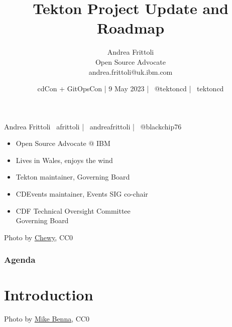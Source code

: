 \documentclass[aspectratio=169,11pt,hyperref={colorlinks=true}]{beamer}
\title{Tekton Project Update and Roadmap \faRobot\faCat}
\date[9 May 2023 ]{cdCon + GitOpsCon | 9 May 2023 | \faTwitter ~@tektoncd | \faGithub ~tektoncd}
\author[Andrea Frittoli]{%
  Andrea Frittoli \\
  Open Source Advocate \\
  andrea.frittoli@uk.ibm.com
}
\begin{document}
\begin{frame}
\titlepage{}
\end{frame}

\begin{speakerframe}{Andrea Frittoli}%
  {%
  \faGithub ~afrittoli | \faLinkedin ~andreafrittoli | \faTwitter ~@blackchip76
  }%
  {%
  \begin{itemize}
    \item{Open Source Advocate @ IBM}
    \item{Lives in Wales, enjoys the wind}
    \item{Tekton maintainer, Governing Board}
    \item{CDEvents maintainer, Events SIG co-chair}
    \item{CDF Technical Oversight Committee \\ Governing Board}
  \end{itemize}
  }%
\end{speakerframe}

\begin{lpicrblack}{%
  Photo by \href{https://unsplash.com/@chewy}{\underline{Chewy}}, CC0
  }%
  {%
  \tableofcontents
  }%
  {}
  \frametitle{Agenda}
\end{lpicrblack}

\section[Introduction]{Introduction}

\begin{sectionwithpic}{Photo by \href{https://unsplash.com/@mbenna}{\underline{Mike Benna}}, CC0}
\end{sectionwithpic}
\end{document}
